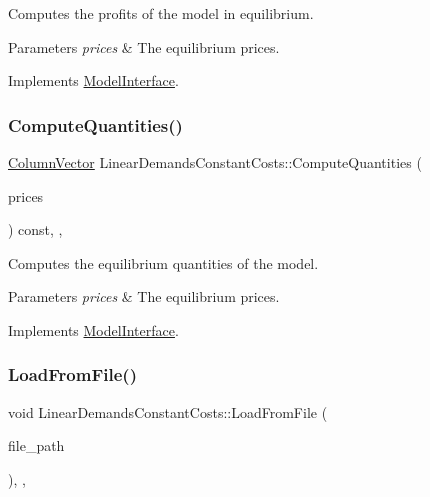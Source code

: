Computes the profits of the model in equilibrium.


\begin{DoxyParams}{Parameters}
{\em prices} & The equilibrium prices. \\
\hline
\end{DoxyParams}


Implements \hyperlink{classModelInterface_a311a000060cece8fc1058cd27bf07864}{Model\+Interface}.

\mbox{\label{classLinearDemandsConstantCosts_a310864e458935098502561540a71a88c}} 
\subsubsection{\texorpdfstring{Compute\+Quantities()}{ComputeQuantities()}}
{\footnotesize\ttfamily \hyperlink{classColumnVector}{Column\+Vector} Linear\+Demands\+Constant\+Costs\+::\+Compute\+Quantities (\begin{DoxyParamCaption}\item[{\hyperlink{classColumnVector}{Column\+Vector} const \&}]{prices }\end{DoxyParamCaption}) const\hspace{0.3cm}{\ttfamily [final]}, {\ttfamily [override]}, {\ttfamily [virtual]}}

Computes the equilibrium quantities of the model.


\begin{DoxyParams}{Parameters}
{\em prices} & The equilibrium prices. \\
\hline
\end{DoxyParams}


Implements \hyperlink{classModelInterface_af9a936f6f0d1b1f0f2c5bf35785e7db4}{Model\+Interface}.

\mbox{\label{classLinearDemandsConstantCosts_a075add461e368629b9dfd8f72033e2ad}} 
\subsubsection{\texorpdfstring{Load\+From\+File()}{LoadFromFile()}}
{\footnotesize\ttfamily void Linear\+Demands\+Constant\+Costs\+::\+Load\+From\+File (\begin{DoxyParamCaption}\item[{std\+::string const \&}]{file\+\_\+path }\end{DoxyParamCaption})\hspace{0.3cm}{\ttfamily [final]}, {\ttfamily [override]}, {\ttfamily [virtual]}}

